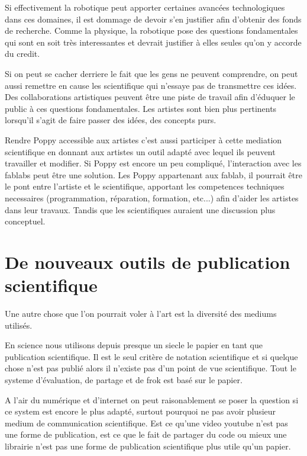 Si effectivement la robotique peut apporter certaines avancées technologiques dans ces domaines, il est dommage de devoir s'en justifier afin d'obtenir des fonds de recherche. Comme la physique, la robotique pose des questions fondamentales qui sont en soit très interessantes et devrait justifier à elles seules qu'on y accorde du credit.

Si on peut se cacher derriere le fait que les gens ne peuvent comprendre, on peut aussi remettre en cause les scientifique qui n'essaye pas de transmettre ces idées. Des collaborations artistiques peuvent être une piste de travail afin d'éduquer le public à ces questions fondamentales. Les artistes sont bien plus pertinents lorsqu'il s'agit de faire passer des idées, des concepts purs.

Rendre Poppy accessible aux artistes c'est aussi participer à cette mediation scientifique en donnant aux artistes un outil adapté avec lequel ils peuvent travailler et modifier. Si Poppy est encore un peu compliqué, l'interaction avec les fablabs peut être une solution. Les Poppy appartenant aux fablab, il pourrait être le pont entre l'artiste et le scientifique, apportant les competences techniques necessaires (programmation, réparation, formation, etc...) afin d'aider les artistes dans leur travaux. Tandis que les scientifiques auraient une discussion plus conceptuel.

\section{De nouveaux outils de publication scientifique} %

Une autre chose que l'on pourrait voler à l'art est la diversité des mediums utilisés.

En science nous utilisons depuis presque un siecle le papier en tant que publication scientifique. Il est le seul critère de notation scientifique et si quelque chose n'est pas publié alors il n'existe pas d'un point de vue scientifique. Tout le systeme d'évaluation, de partage et de frok est basé sur le papier.

A l'air du numérique et d'internet on peut raisonablement se poser la question si ce system est encore le plus adapté, surtout pourquoi ne pas avoir plusieur medium de communication scientifique. Est ce qu'une video youtube n'est pas une forme de publication, est ce que le fait de partager du code ou mieux une librairie n'est pas une forme de publication scientifique plus utile qu'un papier.

